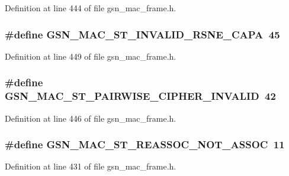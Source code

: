 Definition at line 444 of file gsn\_\-mac\_\-frame.h.

\hypertarget{a00523_aa8bb6b9dd6f74a8c754c04495e2705ec}{
\subsubsection[{GSN\_\-MAC\_\-ST\_\-INVALID\_\-RSNE\_\-CAPA}]{\setlength{\rightskip}{0pt plus 5cm}\#define GSN\_\-MAC\_\-ST\_\-INVALID\_\-RSNE\_\-CAPA~45}}
\label{a00523_aa8bb6b9dd6f74a8c754c04495e2705ec}


Definition at line 449 of file gsn\_\-mac\_\-frame.h.

\hypertarget{a00523_a4532c1f13c11bfad4900549e8cfad8a2}{
\subsubsection[{GSN\_\-MAC\_\-ST\_\-PAIRWISE\_\-CIPHER\_\-INVALID}]{\setlength{\rightskip}{0pt plus 5cm}\#define GSN\_\-MAC\_\-ST\_\-PAIRWISE\_\-CIPHER\_\-INVALID~42}}
\label{a00523_a4532c1f13c11bfad4900549e8cfad8a2}


Definition at line 446 of file gsn\_\-mac\_\-frame.h.

\hypertarget{a00523_aa8e8cb36d0c35c14f6d3aab8014c4385}{
\subsubsection[{GSN\_\-MAC\_\-ST\_\-REASSOC\_\-NOT\_\-ASSOC}]{\setlength{\rightskip}{0pt plus 5cm}\#define GSN\_\-MAC\_\-ST\_\-REASSOC\_\-NOT\_\-ASSOC~11}}
\label{a00523_aa8e8cb36d0c35c14f6d3aab8014c4385}


Definition at line 431 of file gsn\_\-mac\_\-frame.h.

